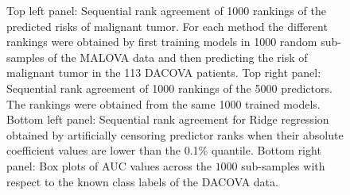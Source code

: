 \documentclass[oupdraft]{bio}
\begin{document}
\begin{figure}[htbp]
\begin{center}
\end{center}
\caption{Top left panel: Sequential rank agreement of 1000 rankings of the
  predicted risks of malignant tumor. For each method the different
  rankings were obtained by first training models in 1000 random
  sub-samples of the MALOVA data and then predicting the risk of
  malignant tumor in the 113 DACOVA patients. Top right panel: Sequential
  rank agreement of 1000 rankings of the 5000 predictors. The rankings
  were obtained from the same 1000 trained models.
Bottom left panel: Sequential rank agreement for Ridge regression
  obtained by artificially censoring predictor ranks when their absolute
  coefficient values are lower than the 0.1\% quantile. Bottom right panel:
  Box plots of AUC values across the $1000$ sub-samples with respect
  to the known class labels of the DACOVA data.
}
 \label{fig:app1}
\end{figure}

%

\newpage
\end{document}
